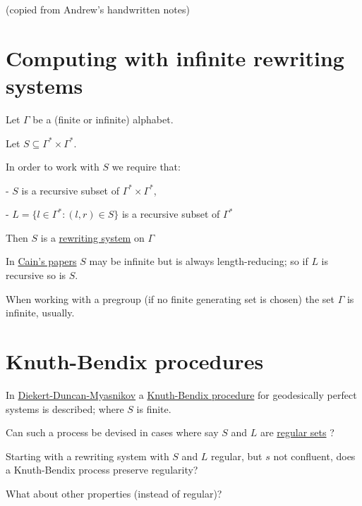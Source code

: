 \documentclass[a4paper]{article}
\begin{document}
(copied from Andrew's handwritten notes)

\section{Computing with infinite rewriting systems}

Let $\Gamma$ be a (finite or infinite) alphabet.

Let $S \subseteq \Gamma^\ast \times \Gamma^\ast$.

In order to work with $S$ we require that:

- $S$ is a recursive subset of $\Gamma^\ast \times \Gamma^\ast$,

- $L = \{ l \in \Gamma^\ast : (l,r) \in S \}$ is a recursive subset of $\Gamma^\ast$

Then $S$ is a \href{http://en.wikipedia.org/wiki/Term_rewriting_system}{rewriting system} on $\Gamma$



In \href{http://www-history.mcs.st-and.ac.uk/~alanc/pub/articles.html,}{Cain's papers} $S$ may be infinite but is always length-reducing; so if $L$ is recursive so is $S$.



When working with a pregroup (if no finite generating set is chosen) the set $\Gamma$ is infinite, usually.



\section{Knuth-Bendix procedures}

In \href{http://www.fmi.uni-stuttgart.de/ti/veroeffentlichungen/pdffiles/DiekertDuncanMiasnikov2010.pdf}{Diekert-Duncan-Myasnikov} a \href{http://en.wikipedia.org/wiki/Knuth%E2%80%93Bendix_completion_algorithm}{Knuth-Bendix procedure} for geodesically perfect systems is described; where $S$ is finite.

Can such a process be devised in cases where say $S$ and $L$ are \href{http://en.wikipedia.org/wiki/Regular_language}{regular sets} ?



Starting with a rewriting system with $S$ and $L$ regular, but $s$ not confluent, does a Knuth-Bendix process preserve regularity?



What about other properties (instead of regular)?
\end{document}
